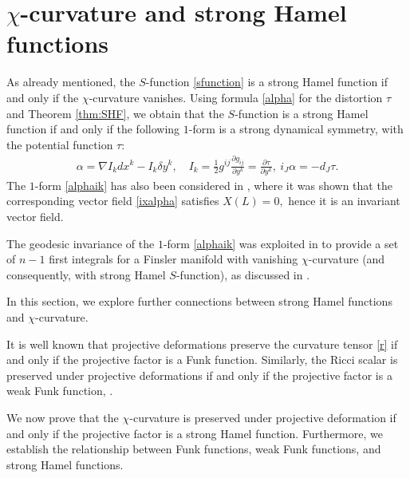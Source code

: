 \documentclass[oneside,english]{amsart}
\theoremstyle{definition}
\theoremstyle{plain}
\theoremstyle{plain}
\theoremstyle{plain}
\theoremstyle{remark}
\theoremstyle{remark}
\theoremstyle{remark}
\begin{document}
  

\section{$\chi$-curvature and strong Hamel functions}

As already mentioned, the $S$-function \eqref{sfunction} is a strong Hamel function if and only if the $\chi$-curvature vanishes. Using formula \eqref{alpha} for the distortion $\tau$ and Theorem \ref{thm:SHF}, we obtain that the $S$-function is a strong Hamel function if and only if the following $1$-form is a strong dynamical symmetry, with the potential function $\tau$:
\begin{eqnarray}
\alpha=\nabla I_k dx^k - I_k \delta y^k, \quad I_k=\frac{1}{2}g^{ij}\frac{\partial g_{ij}}{\partial y^k}=\frac{\partial \tau}{\partial y^k}, \ i_J\alpha=-d_J\tau. \label{alphaik}
\end{eqnarray} 
The $1$-form \eqref{alphaik} has also been considered in \cite[Section 8]{Crampin24}, where it was shown that the corresponding vector field \eqref{ixalpha} satisfies $X(L)=0,$ hence it is an invariant vector field.

The geodesic invariance of the $1$-form \eqref{alphaik} was exploited in \cite[Lemma 3.2]{BCC22} to provide a set of $n-1$ first integrals for a Finsler manifold with vanishing $\chi$-curvature (and consequently, with strong Hamel $S$-function), as discussed in \cite[Theorem 1.1]{BCC22}. 

In this section, we explore further connections between strong Hamel functions and $\chi$-curvature.

It is well known that projective deformations preserve the curvature tensor \eqref{r} if and only if the projective factor is a Funk function. Similarly, the Ricci scalar is preserved under projective deformations if and only if the projective factor is a weak Funk function, \cite[Proposition 12.1.3]{Shen01}.

We now prove that the $\chi$-curvature is preserved under projective deformation if and only if the projective factor is a strong Hamel function. Furthermore, we establish the relationship between Funk functions, weak Funk functions, and strong Hamel functions.
\end{document}
